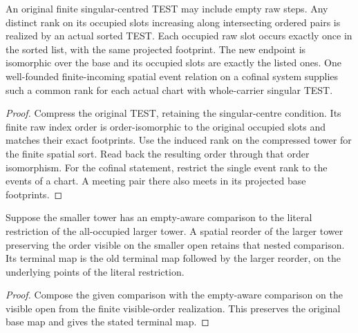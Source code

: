 \begin{theorem}
\label{hir:g8-rank-sorted-raw-charts}
\leanok
An original finite singular-centred TEST may include empty raw
steps. Any distinct rank on its occupied slots increasing along
intersecting ordered pairs is realized by an actual sorted TEST.
Each occupied raw slot occurs exactly once in the sorted list,
with the same projected footprint. The new endpoint is isomorphic
over the base and its occupied slots are exactly the listed ones.
One well-founded finite-incoming spatial event relation on a
cofinal system supplies such a common rank for each actual chart
with whole-carrier singular TEST.
\end{theorem}
\begin{proof}
Compress the original TEST, retaining the singular-centre condition.
Its finite raw index order is order-isomorphic to the original
occupied slots and matches their exact footprints. Use the induced
rank on the compressed tower for the finite spatial sort. Read back
the resulting order through that order isomorphism. For the cofinal
statement, restrict the single event rank to the events of a chart.
A meeting pair there also meets in its projected base footprints.
\end{proof}

\begin{corollary}
\label{hir:g8-nested-visible-reordering}
\leanok
Suppose the smaller tower has an empty-aware comparison to the
literal restriction of the all-occupied larger tower. A spatial
reorder of the larger tower preserving the order visible on the
smaller open retains that nested comparison. Its terminal map is
the old terminal map followed by the larger reorder, on the
underlying points of the literal restriction.
\end{corollary}
\begin{proof}
Compose the given comparison with the empty-aware comparison on
the visible open from the finite visible-order realization. This
preserves the original base map and gives the stated terminal map.
\end{proof}

